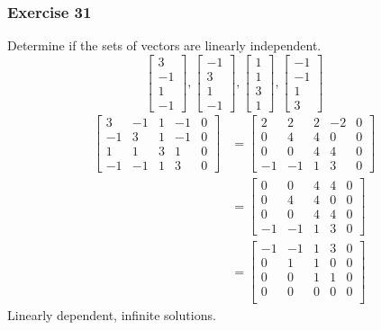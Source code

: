 \documentclass{math}
\begin{document}
\subsubsection*{Exercise 31}
Determine if the sets of vectors are linearly independent.
\[ \begin{bmatrix}3 \\ -1 \\ 1 \\ -1\end{bmatrix},
  \begin{bmatrix}-1 \\ 3 \\ 1 \\ -1\end{bmatrix},
  \begin{bmatrix}1 \\ 1 \\ 3 \\ 1\end{bmatrix},
  \begin{bmatrix}-1 \\ -1 \\ 1 \\ 3\end{bmatrix} \]
\begin{align*}
  \begin{bmatrix}
    3 & -1 & 1 & -1 & 0 \\
    -1 & 3 & 1 & -1 & 0 \\
    1 & 1 & 3 & 1 & 0 \\
    -1 & -1 & 1 & 3 & 0
  \end{bmatrix} &= \begin{bmatrix}
    2 & 2 & 2 & -2 & 0 \\
    0 & 4 & 4 & 0 & 0 \\
    0 & 0 & 4 & 4 & 0 \\
    -1 & -1 & 1 & 3 & 0
  \end{bmatrix} \\
  &= \begin{bmatrix}
    0 & 0 & 4 & 4 & 0 \\
    0 & 4 & 4 & 0 & 0 \\
    0 & 0 & 4 & 4 & 0 \\
    -1 & -1 & 1 & 3 & 0
  \end{bmatrix} \\
  &= \begin{bmatrix}
    -1 & -1 & 1 & 3 & 0 \\
    0 & 1 & 1 & 0 & 0 \\
    0 & 0 & 1 & 1 & 0 \\
    0 & 0 & 0 & 0 & 0 \\
  \end{bmatrix}
\end{align*}
Linearly dependent, infinite solutions.
\end{document}
